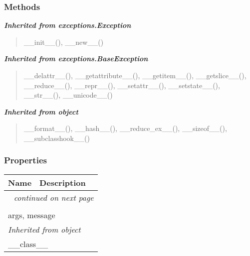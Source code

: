   \subsubsection{Methods}


\large{\textbf{\textit{Inherited from exceptions.Exception}}}

\begin{quote}
\_\_init\_\_(), \_\_new\_\_()
\end{quote}

\large{\textbf{\textit{Inherited from exceptions.BaseException}}}

\begin{quote}
\_\_delattr\_\_(), \_\_getattribute\_\_(), \_\_getitem\_\_(), \_\_getslice\_\_(), \_\_reduce\_\_(), \_\_repr\_\_(), \_\_setattr\_\_(), \_\_setstate\_\_(), \_\_str\_\_(), \_\_unicode\_\_()
\end{quote}

\large{\textbf{\textit{Inherited from object}}}

\begin{quote}
\_\_format\_\_(), \_\_hash\_\_(), \_\_reduce\_ex\_\_(), \_\_sizeof\_\_(), \_\_subclasshook\_\_()
\end{quote}


  \subsubsection{Properties}

    \vspace{-1cm}
\hspace{\varindent}\begin{longtable}{|p{\varnamewidth}|p{\vardescrwidth}|l}
\cline{1-2}
\cline{1-2} \centering \textbf{Name} & \centering \textbf{Description}& \\
\cline{1-2}
\endhead\cline{1-2}\multicolumn{3}{r}{\small\textit{continued on next page}}\\\endfoot\cline{1-2}
\endlastfoot\multicolumn{2}{|l|}{\textit{Inherited from exceptions.BaseException}}\\
\multicolumn{2}{|p{\varwidth}|}{\raggedright args, message}\\
\cline{1-2}
\multicolumn{2}{|l|}{\textit{Inherited from object}}\\
\multicolumn{2}{|p{\varwidth}|}{\raggedright \_\_class\_\_}\\
\cline{1-2}
\end{longtable}

